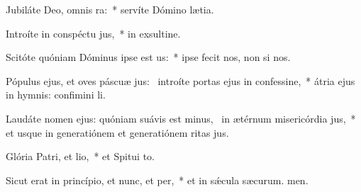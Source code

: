 \item Jubiláte Deo, omnis ra:~* servíte Dómino  lætia.
\item Introíte in conspéctu jus,~* in exsultine.
\item Scitóte quóniam Dóminus ipse est us:~* ipse fecit nos,  non si nos.
\item Pópulus ejus, et oves páscuæ jus:~\pscross{} introíte portas ejus in confessine,~* átria ejus in hymnis: confimini li.
\item Laudáte nomen ejus: quóniam suávis est minus,~\pscross{} in ætérnum misericórdia jus,~* et usque in generatiónem et generatiónem ritas jus.
\item Glória Patri, et lio,~* et Spitui to.
\item Sicut erat in princípio, et nunc, et per,~* et in sǽcula sæcurum. men.
